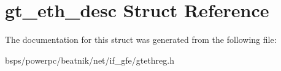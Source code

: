 \hypertarget{structgt__eth__desc}{}\section{gt\+\_\+eth\+\_\+desc Struct Reference}
\label{structgt__eth__desc}


The documentation for this struct was generated from the following file\+:\begin{DoxyCompactItemize}
\item 
bsps/powerpc/beatnik/net/if\+\_\+gfe/gtethreg.\+h\end{DoxyCompactItemize}
